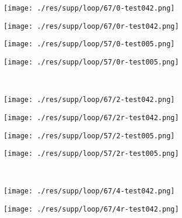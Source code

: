 \documentclass{article} %
\begin{document}
\begin{figure}[htp!]
	\centering
	\begin{subfigure}[t]{0.22\textwidth}
		\centering
		\texttt{[image: ./res/supp/loop/67/0-test042.png]}
	\end{subfigure}
	\begin{subfigure}[t]{0.22\textwidth}
		\centering
		\texttt{[image: ./res/supp/loop/67/0r-test042.png]}
	\end{subfigure}
	\hspace{2pt}
	\begin{subfigure}[t]{0.22\textwidth}
		\centering
		\texttt{[image: ./res/supp/loop/57/0-test005.png]}
	\end{subfigure}
	\begin{subfigure}[t]{0.22\textwidth}
		\centering
		\texttt{[image: ./res/supp/loop/57/0r-test005.png]}
	\end{subfigure}\\
	\begin{subfigure}[t]{0.22\textwidth}
		\centering
		\texttt{[image: ./res/supp/loop/67/2-test042.png]}
	\end{subfigure}
	\begin{subfigure}[t]{0.22\textwidth}
		\centering
		\texttt{[image: ./res/supp/loop/67/2r-test042.png]}
	\end{subfigure}
	\hspace{2pt}
	\begin{subfigure}[t]{0.22\textwidth}
		\centering
		\texttt{[image: ./res/supp/loop/57/2-test005.png]}
	\end{subfigure}
	\begin{subfigure}[t]{0.22\textwidth}
		\centering
		\texttt{[image: ./res/supp/loop/57/2r-test005.png]}
	\end{subfigure}\\
	\begin{subfigure}[t]{0.22\textwidth}
		\centering
		\texttt{[image: ./res/supp/loop/67/4-test042.png]}
	\end{subfigure}
	\begin{subfigure}[t]{0.22\textwidth}
		\centering
		\texttt{[image: ./res/supp/loop/67/4r-test042.png]}
	\end{subfigure}
	\hspace{2pt}
	\begin{subfigure}[t]{0.22\textwidth}

\end{subfigure}
\end{figure}
\end{document}

